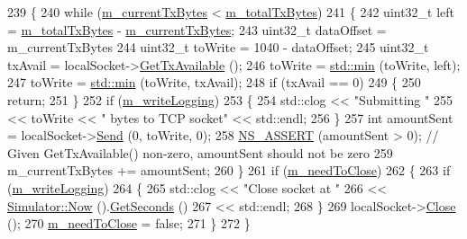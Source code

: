 \begin{DoxyCode}
239 \{
240   \textcolor{keywordflow}{while} (\hyperlink{classNs3TcpStateTestCase_a3d9f4df7a47644ec378929c7ed936fbd}{m\_currentTxBytes} < \hyperlink{classNs3TcpStateTestCase_a360461d408b9c3b88e025e9fb760a92c}{m\_totalTxBytes})
241     \{
242       uint32\_t left = \hyperlink{classNs3TcpStateTestCase_a360461d408b9c3b88e025e9fb760a92c}{m\_totalTxBytes} - \hyperlink{classNs3TcpStateTestCase_a3d9f4df7a47644ec378929c7ed936fbd}{m\_currentTxBytes};
243       uint32\_t dataOffset = m\_currentTxBytes %
244       uint32\_t toWrite = 1040 - dataOffset;
245       uint32\_t txAvail = localSocket->\hyperlink{classns3_1_1Socket_ae7cf62e3acf44106bfa1d40eaeaec151}{GetTxAvailable} ();
246       toWrite = \hyperlink{80211b_8c_ac6afabdc09a49a433ee19d8a9486056d}{std::min} (toWrite, left);
247       toWrite = \hyperlink{80211b_8c_ac6afabdc09a49a433ee19d8a9486056d}{std::min} (toWrite, txAvail);
248       \textcolor{keywordflow}{if} (txAvail == 0)
249         \{
250           \textcolor{keywordflow}{return};
251         \}
252       \textcolor{keywordflow}{if} (\hyperlink{classNs3TcpStateTestCase_a738c5da39e4cbbbfdc5f789675c9405a}{m\_writeLogging})
253         \{
254           std::clog << \textcolor{stringliteral}{"Submitting "}
255                     << toWrite << \textcolor{stringliteral}{" bytes to TCP socket"} << std::endl;
256         \}
257       \textcolor{keywordtype}{int} amountSent = localSocket->\hyperlink{classns3_1_1Socket_a036901c8f485fe5b6eab93b7f2ec289d}{Send} (0, toWrite, 0);
258       \hyperlink{assert_8h_a6dccdb0de9b252f60088ce281c49d052}{NS\_ASSERT} (amountSent > 0);  \textcolor{comment}{// Given GetTxAvailable() non-zero, amountSent should not be
       zero}
259       m\_currentTxBytes += amountSent;
260     \}
261   \textcolor{keywordflow}{if} (\hyperlink{classNs3TcpStateTestCase_adcda588067de3d43d150c5358b883455}{m\_needToClose})
262     \{
263       \textcolor{keywordflow}{if} (\hyperlink{classNs3TcpStateTestCase_a738c5da39e4cbbbfdc5f789675c9405a}{m\_writeLogging})
264         \{
265           std::clog << \textcolor{stringliteral}{"Close socket at "}
266                     <<  \hyperlink{group__simulator_gac3635e2e87f7ce316c89290ee1b01d0d}{Simulator::Now} ().\hyperlink{classns3_1_1Time_a8f20d5c3b0902d7b4320982f340b57c8}{GetSeconds} ()
267                     << std::endl;
268         \}
269       localSocket->\hyperlink{classns3_1_1Socket_abdac6e2498c5aa2963ef361d4200ddf3}{Close} ();
270       \hyperlink{classNs3TcpStateTestCase_adcda588067de3d43d150c5358b883455}{m\_needToClose} = \textcolor{keyword}{false};
271     \}
272 \}
\end{DoxyCode}


